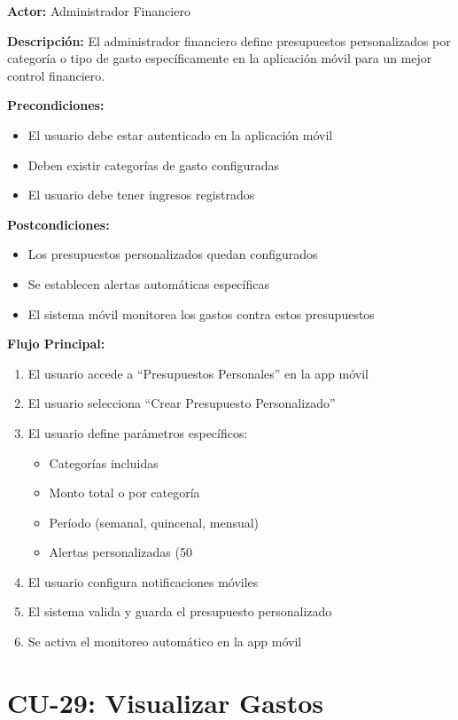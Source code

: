\noindent\textbf{Actor:} Administrador Financiero

\noindent\textbf{Descripción:} El administrador financiero define presupuestos personalizados por categoría o tipo de gasto específicamente en la aplicación móvil para un mejor control financiero.

\noindent\textbf{Precondiciones:}
\begin{itemize}
    \item El usuario debe estar autenticado en la aplicación móvil
    \item Deben existir categorías de gasto configuradas
    \item El usuario debe tener ingresos registrados
\end{itemize}

\noindent\textbf{Postcondiciones:}
\begin{itemize}
    \item Los presupuestos personalizados quedan configurados
    \item Se establecen alertas automáticas específicas
    \item El sistema móvil monitorea los gastos contra estos presupuestos
\end{itemize}

\noindent\textbf{Flujo Principal:}
\begin{enumerate}
    \item El usuario accede a ``Presupuestos Personales'' en la app móvil
    \item El usuario selecciona ``Crear Presupuesto Personalizado''
    \item El usuario define parámetros específicos:
    \begin{itemize}
        \item Categorías incluidas
        \item Monto total o por categoría
        \item Período (semanal, quincenal, mensual)
        \item Alertas personalizadas (50%
    \end{itemize}
    \item El usuario configura notificaciones móviles
    \item El sistema valida y guarda el presupuesto personalizado
    \item Se activa el monitoreo automático en la app móvil
\end{enumerate}

\section{CU-29: Visualizar Gastos}

